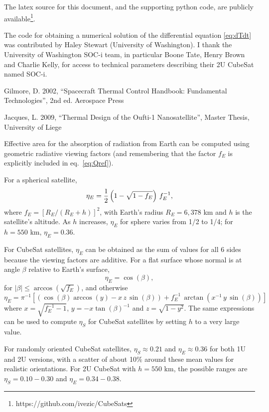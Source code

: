\documentclass[]{aastex62}
\def\eq#1{\begin{equation} #1 \end{equation}}
\begin{document}
The latex source for this document, and the supporting python code, are publicly 
available\footnote{https://github.com/ivezic/CubeSats}. 


\vskip 0.2in 
{} 
The code for obtaining a numerical solution of the differential equation \ref{eq:dTdt} was contributed by 
Haley Stewart (University of Washington). I thank the University of Washington SOC-i team, in particular 
Boone Tate, Henry Brown and Charlie Kelly, for access to technical parameters describing their 2U CubeSat 
named SOC-i. 
 
%
%

\vskip 0.2in 
Gilmore, D. 2002, ``Spacecraft Thermal Control Handbook: Fundamental Technologies'', 2nd ed. Aerospace Press 

Jacques, L. 2009, ``Thermal Design of the Oufti-1 Nanosatellite'', Master Thesis, University of Liege


\newpage
\appendix{}

\vskip 0.2in

\vskip 0.1in
 Effective area for the absorption of radiation from Earth can be computed using geometric radiative viewing factors
(and remembering that the factor $f_E$ is explicitly included in eq.~\ref{eq:Qref}). 

For a spherical satellite, 
\eq{
                  \eta_E  =  {1\over 2}  \left(1 - \sqrt{1- f_E} \right) \, f_E^{-1},
} 
where $f_E=[R_E/(R_E+h)]^2$, with Earth's radius $R_E=6,378$ km and $h$ is the satellite's altitude. As $h$
increases, $\eta_E$ for sphere varies from 1/2 to 1/4; for $h=550$ km, $\eta_E=0.36$.

For CubeSat satellites, $\eta_E$ can be obtained as the sum of values for all 6 sides because the viewing
factors are additive. For a flat surface whose normal is at angle $\beta$ relative to Earth's surface, 
\eq{
            \eta_E  = \cos(\beta), 
} 
for $|\beta|\le\arccos(\sqrt{f_E})$, and otherwise
\eq{
            \eta_E  = \pi^{-1} \left[ \left( \cos(\beta)\arccos(y) - x \,z \, \sin(\beta) \right) + f_E^{-1} \, \arctan(x^{-1} \, y \, \sin(\beta)) \right] 
} 
where $x=\sqrt{f_E^{-1}-1}$, $y=-x\tan(\beta)^{-1}$ and $z=\sqrt{1-y^2}$. The same expressions can
be used to compute $\eta_S$ for CubeSat satellites by setting $h$ to a very large value. 

For randomly oriented CubeSat satellites, $\eta_S \approx 0.21$ and $\eta_E \approx 0.36$ for both 1U and 2U versions,
with a scatter of about 10\% around these mean values for realistic orientations. For 2U CubeSat
with $h=550$ km, the possible ranges are  $\eta_S = 0.10 - 0.30$ and $\eta_E = 0.34 - 0.38$. 
\end{document}

